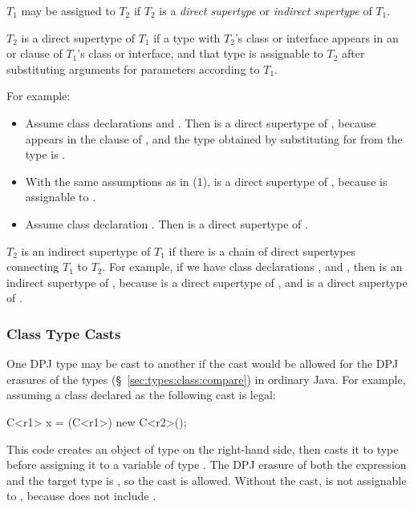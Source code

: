   $T_1$ may be
assigned to $T_2$ if $T_2$ is a \emph{direct supertype} or
\emph{indirect supertype} of $T_1$.

 $T_2$ is a direct supertype of $T_1$ if a
type with $T_2$'s class or interface appears in an  or
 clause of $T_1$'s class or interface, and that type
is assignable to $T_2$ after substituting arguments for parameters
according to $T_1$.

For example:
%
\begin{itemize}
%
\item Assume class declarations 
  and .  Then  is a direct
  supertype of , because  appears in the
   clause of , and the type obtained by
  substituting  for  from the type  is
  .
%
\item With the same assumptions as in (1),  is a direct
  supertype of , because  is assignable to
  .
%
\item Assume class declaration .  Then  is a direct supertype
  of .
%
\end{itemize}
%

 $T_2$ is an indirect supertype of $T_1$
if there is a chain of direct supertypes connecting $T_1$ to $T_2$.
For example, if we have class declarations ,  and , then  is an indirect supertype of
, because  is a direct supertype of
, and  is a direct supertype of
.

\subsubsection{Class Type Casts%
\label{sec:types:class:cast}}

One DPJ type may be cast to another if the cast would be allowed for
the DPJ erasures of the types (\S~\ref{sec:types:class:compare}) in
ordinary Java.  For example, assuming a class declared as  the following cast is legal:
%
\begin{dpjlisting}
C<r1> x = (C<r1>) new C<r2>();
\end{dpjlisting}
%
This code creates an object of type  on the right-hand
side, then casts it to type  before assigning it to a
variable  of type .  The DPJ erasure of both the
 expression and the target type is , so the cast is
allowed.  Without the cast,  is not assignable to
, because  does not include .

